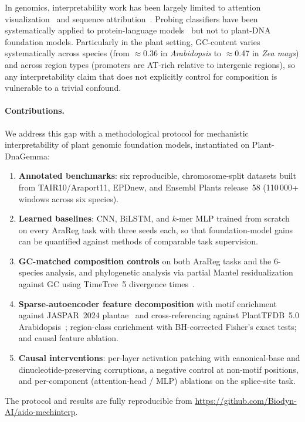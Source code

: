 \documentclass[11pt, a4paper]{article}
\begin{document}
In genomics, interpretability work has been largely limited to attention
visualization~\citep{clauwaert2021explainability} and sequence
attribution~\citep{avsec2021effective}. Probing classifiers have been
systematically applied to protein-language models~\citep{vig2021bertology,
rao2019evaluating, rives2021biological} but not to plant-DNA foundation
models. Particularly in the plant setting, GC-content varies systematically
across species (from $\approx$0.36 in \textit{Arabidopsis} to $\approx$0.47
in \textit{Zea mays}) and across region types (promoters are AT-rich
relative to intergenic regions), so any interpretability claim that does not
explicitly control for composition is vulnerable to a trivial confound.

\paragraph{Contributions.}
We address this gap with a methodological protocol for mechanistic
interpretability of plant genomic foundation models, instantiated on
Plant-DnaGemma:
\begin{enumerate}[leftmargin=1.4em,topsep=0.2em,itemsep=0.15em]
    \item \textbf{Annotated benchmarks}: six reproducible, chromosome-split
    datasets built from TAIR10/Araport11, EPDnew, and Ensembl Plants
    release~58 (110\,000+ windows across six species).
    \item \textbf{Learned baselines}: CNN, BiLSTM, and $k$-mer MLP trained
    from scratch on every AraReg task with three seeds each, so that
    foundation-model gains can be quantified against methods of comparable
    task supervision.
    \item \textbf{GC-matched composition controls} on both AraReg tasks
    and the 6-species analysis, and phylogenetic analysis via partial
    Mantel residualization against GC using TimeTree~5 divergence
    times~\citep{kumar2022timetree}.
    \item \textbf{Sparse-autoencoder feature decomposition} with motif
    enrichment against JASPAR~2024 plantae~\citep{rauluseviciute2024jaspar}
    and cross-referencing against PlantTFDB~5.0
    Arabidopsis~\citep{tian2020plantregmap}; region-class enrichment with
    BH-corrected Fisher's exact tests; and causal feature ablation.
    \item \textbf{Causal interventions}: per-layer activation patching with
    canonical-base and dinucleotide-preserving corruptions, a negative
    control at non-motif positions, and per-component (attention-head / MLP)
    ablations on the splice-site task.
\end{enumerate}
The protocol and results are fully reproducible from
\url{https://github.com/Biodyn-AI/aido-mechinterp}.
\end{document}
